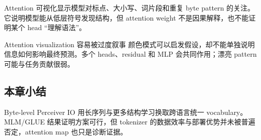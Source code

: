 Attention 可视化显示模型对标点、大小写、词片段和重复 byte pattern 的关注。它说明模型能从低层符号发现结构，但 attention weight 不是因果解释，也不能证明某个 head “理解语法”。



\begin{warningbox}{Attention visualization 容易被过度叙事}
颜色模式可以启发假设，却不能单独说明信息如何影响最终预测。多个 heads、residual 和 MLP 会共同作用；漂亮 pattern 可能与任务贡献很弱。
\end{warningbox}

\subsection{本章小结}

Byte-level Perceiver IO 用长序列与更多结构学习换取跨语言统一 vocabulary。MLM/GLUE 结果证明方案可行，但 tokenizer 的数据效率与部署优势并未被普遍否定，attention map 也只是诊断证据。

